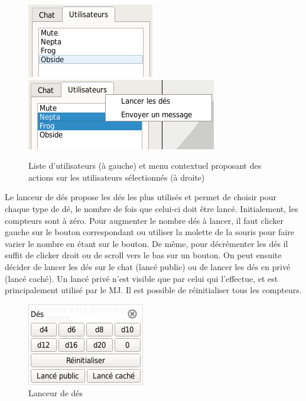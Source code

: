 \begin{figure}[h!]
	\centering
	\includegraphics[scale=0.5]{img/chat_userlist_1.png}
	\hspace{10 mm}
	\includegraphics[scale=0.5]{img/chat_userlist_2.png}
	\caption{Liste d'utilisateurs (à gauche) et menu contextuel proposant des actions sur les utilisateurs sélectionnés (à droite)}
\end{figure}

\newpage

Le lanceur de dés propose les dés les plus utilisés et permet de choisir pour chaque type de dé, le nombre de fois que celui-ci doit être lancé. Initialement, les compteurs sont à zéro. Pour augmenter le nombre dés à lancer, il faut clicker gauche sur le bouton correspondant ou utiliser la molette de la souris pour faire varier le nombre en étant sur le bouton. De même, pour décrémenter les dés il suffit de clicker droit ou de scroll vers le bas sur un bouton. On peut ensuite décider de lancer les dés sur le chat (lancé public) ou de lancer les dés en privé (lancé caché). Un lancé privé n'est visible que par celui qui l'effectue, et est principalement utilisé par le MJ. Il est possible de réinitialiser tous les compteurs.

\begin{figure}[h!]
	\centering
	\includegraphics[scale=0.5]{img/dice_manager.png}
	\caption{Lanceur de dés}
\end{figure}

